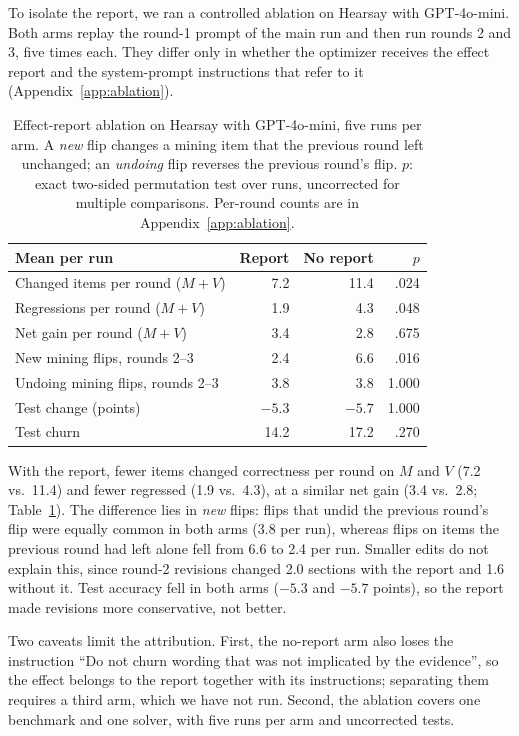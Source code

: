 \documentclass[11pt]{article}
\begin{document}
To isolate the report, we ran a controlled ablation on Hearsay with GPT-4o-mini. Both arms replay the round-1 prompt of the main run and then run rounds 2 and 3, five times each. They differ only in whether the optimizer receives the effect report and the system-prompt instructions that refer to it (Appendix~\ref{app:ablation}).

\begin{table}[!t]
\centering
\small
\setlength{\tabcolsep}{3pt}
\begin{tabular}{lrrr}
\toprule
\rowcolor{midblue}
Mean per run & Report & No report & $p$ \\
\midrule
Changed items per round ($M{+}V$) & 7.2 & 11.4 & .024 \\
Regressions per round ($M{+}V$) & 1.9 & 4.3 & .048 \\
Net gain per round ($M{+}V$) & 3.4 & 2.8 & .675 \\
New mining flips, rounds 2--3 & 2.4 & 6.6 & .016 \\
Undoing mining flips, rounds 2--3 & 3.8 & 3.8 & 1.000 \\
Test change (points) & $-5.3$ & $-5.7$ & 1.000 \\
Test churn & 14.2 & 17.2 & .270 \\
\bottomrule
\end{tabular}
\caption{Effect-report ablation on Hearsay with GPT-4o-mini, five runs per arm. A \emph{new} flip changes a mining item that the previous round left unchanged; an \emph{undoing} flip reverses the previous round's flip. $p$: exact two-sided permutation test over runs, uncorrected for multiple comparisons. Per-round counts are in Appendix~\ref{app:ablation}.}
\label{tab:ablation}
\end{table}

With the report, fewer items changed correctness per round on $M$ and $V$ (7.2 vs.\ 11.4) and fewer regressed (1.9 vs.\ 4.3), at a similar net gain (3.4 vs.\ 2.8; Table~\ref{tab:ablation}). The difference lies in \emph{new} flips: flips that undid the previous round's flip were equally common in both arms (3.8 per run), whereas flips on items the previous round had left alone fell from 6.6 to 2.4 per run. Smaller edits do not explain this, since round-2 revisions changed 2.0 sections with the report and 1.6 without it. Test accuracy fell in both arms ($-5.3$ and $-5.7$ points), so the report made revisions more conservative, not better.

Two caveats limit the attribution. First, the no-report arm also loses the instruction ``Do not churn wording that was not implicated by the evidence'', so the effect belongs to the report together with its instructions; separating them requires a third arm, which we have not run. Second, the ablation covers one benchmark and one solver, with five runs per arm and uncorrected tests.
\end{document}
